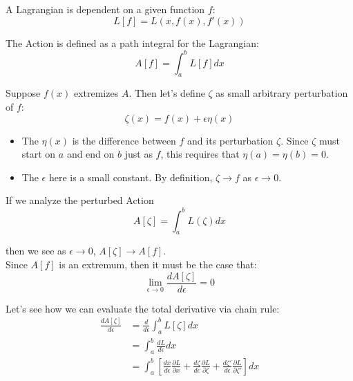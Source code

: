 \documentclass{article}
\newcommand{\DD}[2]{\frac{d #1}{d #2}}
\newcommand{\PD}[2]{\frac{\partial #1}{\partial #2}}
\begin{document}

A Lagrangian is dependent on a given function $f$:
\begin{equation}
    L[f] = L \left( x, f(x), f'(x) \right)
\end{equation}

The Action is defined as a path integral for the Lagrangian:
\begin{equation}
    A[f] = \int_a^b L[f] dx
\end{equation}

Suppose $f(x)$ extremizes $A$. Then let's define $\zeta$ as small arbitrary perturbation of $f$:
\begin{equation}
    \label{eqn:perturbation}
    \zeta(x) = f(x) + \epsilon \eta(x)
\end{equation}
\begin{itemize}
    \setlength{\itemindent}{2em}
    \item The $\eta(x)$ is the difference between $f$ and its perturbation $\zeta$. Since $\zeta$ must start on $a$ and end on $b$ just as $f$, this requires that $\eta(a) = \eta(b) = 0$.
    \item The $\epsilon$ here is a small constant. By definition, $\zeta \to f$ as $\epsilon \to 0$.
\end{itemize}

If we analyze the perturbed Action
\begin{equation}
    A[\zeta] = \int_a^b L \left( \zeta \right) dx
\end{equation}

\hspace{\parindent} then we see as $\epsilon \to 0$, $A[\zeta] \to A[f]$.
\\

Since $A[f]$ is an extremum, then it must be the case that:
\begin{equation}
    \label{eqn:actionlimit}
    \lim_{\epsilon \to 0} \DD{A[\zeta]}{\epsilon} = 0
\end{equation}

Let's see how we can evaluate the total derivative via chain rule:
\begin{align}
    \DD{A[\zeta]}{\epsilon}
     & = \DD{}{\epsilon} \int_a^b L [\zeta] dx \\
     & = \int_a^b \DD{L}{\epsilon} dx          \\
     & = \int_a^b \left[
        \DD{x}{\epsilon} \PD{L}{x}
        + \DD{\zeta}{\epsilon} \PD{L}{\zeta}
        + \DD{\zeta'}{\epsilon} \PD{L}{\zeta'}
        \right] dx
\end{align}
\end{document}
